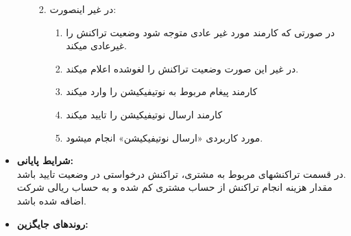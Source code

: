\documentclass{article}
\begin{document}
\begin{itemize}
\begin{enumerate}
\begin{enumerate}
\begin{enumerate}
\end{enumerate}
\item در غیر اینصورت:
\begin{enumerate}
\item  در صورتی که کارمند مورد غیر عادی متوجه شود وضعیت تراکنش را غیرعادی میکند.
\item در غیر این صورت وضعیت تراکنش را لغوشده اعلام میکند.
\item کارمند پیغام مربوط به نوتیفیکیشن را وارد میکند
\item کارمند ارسال نوتیفیکیشن را تایید میکند
\item مورد کاربردی  «ارسال نوتیفیکیشن» انجام میشود.
\end{enumerate}
\end{enumerate}

\end{enumerate}

\item \textbf{شرایط پایانی:}\\ 
در قسمت تراکنشهای مربوط به مشتری، تراکنش درخواستی در وضعیت تایید باشد.\\
مقدار هزینه انجام تراکنش از حساب مشتری کم شده و به حساب ریالی شرکت اضافه شده باشد.\\
\item \textbf{روندهای جایگزین:}\\


\end{itemize}


\noindent\makebox[\linewidth]{\rule{\paperwidth}{0.4pt}}
\end{document}
